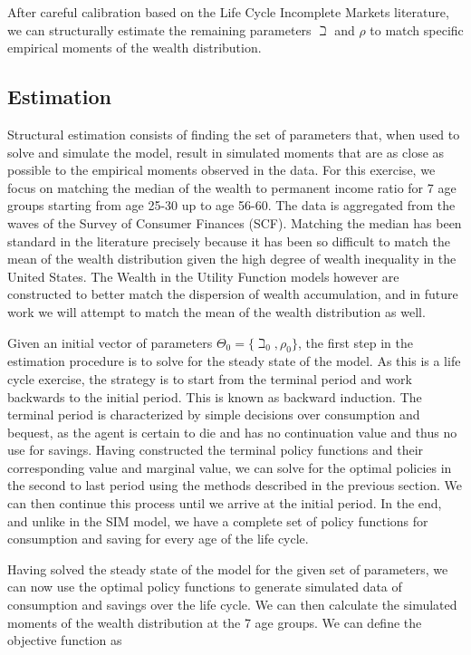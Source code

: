 \documentclass{article}
\newcommand{\CRRA}{\rho}
\begin{document}
After careful calibration based on the Life Cycle Incomplete Markets literature, we can structurally estimate the remaining parameters $\beth$ and $\CRRA$ to match specific empirical moments of the wealth distribution.

\subsection{Estimation}\label{Estimation}

Structural estimation consists of finding the set of parameters that, when used to solve and simulate the model, result in simulated moments that are as close as possible to the empirical moments observed in the data. For this exercise, we focus on matching the median of the wealth to permanent income ratio for 7 age groups starting from age 25-30 up to age 56-60. The data is aggregated from the waves of the Survey of Consumer Finances (SCF). Matching the median has been standard in the literature precisely because it has been so difficult to match the mean of the wealth distribution given the high degree of wealth inequality in the United States. The Wealth in the Utility Function models however are constructed to better match the dispersion of wealth accumulation, and in future work we will attempt to match the mean of the wealth distribution as well.

Given an initial vector of parameters $\Theta_0 = \{\beth_0, \CRRA_0 \}$, the first step in the estimation procedure is to solve for the steady state of the model. As this is a life cycle exercise, the strategy is to start from the terminal period and work backwards to the initial period. This is known as backward induction. The terminal period is characterized by simple decisions over consumption and bequest, as the agent is certain to die and has no continuation value and thus no use for savings. Having constructed the terminal policy functions and their corresponding value and marginal value, we can solve for the optimal policies in the second to last period using the methods described in the previous section. We can then continue this process until we arrive at the initial period. In the end, and unlike in the SIM model, we have a complete set of policy functions for consumption and saving for every age of the life cycle.

Having solved the steady state of the model for the given set of parameters, we can now use the optimal policy functions to generate simulated data of consumption and savings over the life cycle. We can then calculate the simulated moments of the wealth distribution at the 7 age groups. We can define the objective function as
\end{document}
